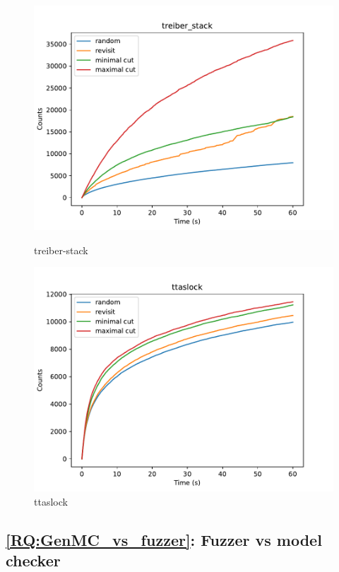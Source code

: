 \begin{figure}[h!]
	\begin{minipage}{0.45\textwidth}
		\centering
		\includegraphics[width=\textwidth]{figure/genmc-time/treiber_stack.pdf}
		\caption{treiber-stack}
		\label{genmc:treiber_stack-time}
	\end{minipage}
	\hfill
	\begin{minipage}{0.45\textwidth}
		\centering
		\includegraphics[width=\textwidth]{figure/genmc-time/ttaslock.pdf}
		\caption{ttaslock}
		\label{genmc:ttaslock-time}
	\end{minipage}
\end{figure}



\subsection{\ref*{RQ:GenMC_vs_fuzzer}: Fuzzer vs model checker }

